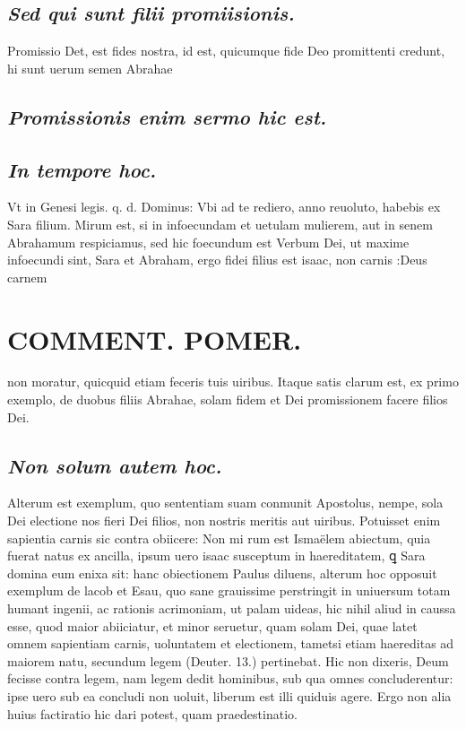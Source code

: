 \documentclass{article}
\begin{document}
\begin{pages}
\subsection*{\textit{Sed qui sunt filii promiisionis. }}\pstart Promissio Det, est fides nostra, id est, quicumque fide Deo promittenti credunt, hi sunt uerum semen Abrahae\pend
{}
{}
\subsection*{\textit{Promissionis enim sermo hic est. }}
{}
\subsection*{\textit{In tempore hoc. }}\pstart Vt in Genesi legis. q. d. Dominus: Vbi ad te rediero, anno reuoluto, habebis ex Sara filium. Mirum est, si in infoecundam et uetulam mulierem, aut in senem Abrahamum respiciamus, sed hic foecundum est Verbum Dei, ut maxime infoecundi sint, Sara et Abraham, ergo fidei filius est isaac, non carnis :Deus carnem  \pend
\section*{COMMENT. POMER.  }\pstart non moratur, quicquid etiam feceris tuis uiribus. Itaque  satis clarum est, ex primo exemplo, de duobus filiis Abrahae, solam fidem et Dei promissionem facere filios Dei.  \pend
{}
{}
\subsection*{\textit{Non solum autem hoc. }}\pstart Alterum est exemplum, quo sententiam suam conmunit Apostolus, nempe, sola Dei electione nos fieri Dei filios, non nostris meritis aut uiribus. Potuisset enim sapientia carnis sic contra obiicere: Non mi rum est Ismaëlem abiectum, quia fuerat natus ex ancilla, ipsum uero isaac susceptum in haereditatem, ꝗ Sara domina eum enixa sit: hanc obiectionem Paulus diluens, alterum hoc opposuit exemplum de lacob et Esau, quo sane grauissime perstringit in uniuersum totam humant ingenii, ac rationis acrimoniam, ut palam uideas, hic nihil aliud in caussa esse, quod maior abiiciatur, et minor seruetur, quam solam Dei, quae latet omnem sapientiam carnis, uoluntatem et electionem, tametsi etiam haereditas ad maiorem natu, secundum legem (Deuter. 13.) pertinebat. Hic non dixeris, Deum fecisse contra legem, nam legem dedit hominibus, sub qua omnes concluderentur: ipse uero sub ea concludi non uoluit, liberum est illi quiduis agere. Ergo non alia huius factiratio hic dari potest, quam praedestinatio.  \pend
{}
{}

\end{pages}
\end{document}
